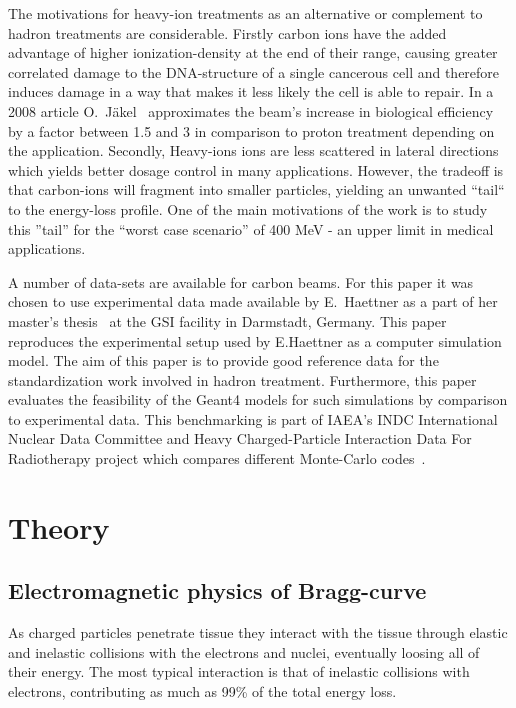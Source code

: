 The motivations for heavy-ion treatments as an alternative or complement to hadron treatments are considerable. Firstly carbon ions have the added advantage of higher ionization-density at the end of their range, causing greater correlated damage to the DNA-structure of a single cancerous cell and therefore induces damage in a way that makes it less likely the cell is able to repair. In a 2008 article O.~Jäkel~\cite{ojakel} approximates the beam's increase in biological efficiency by a factor between 1.5 and 3 in comparison to proton treatment depending on the application. Secondly, Heavy-ions ions are less scattered in lateral directions which yields better dosage control in many applications. However, the tradeoff is that carbon-ions will fragment into smaller particles, yielding an unwanted ``tail`` to the energy-loss profile. One of the main motivations of the work is to study this ''tail'' for the ``worst case scenario'' of 400 MeV - an upper limit in medical applications.

A number of data-sets are available for carbon beams. For this paper it was chosen to use experimental data made available by E.~Haettner as a part of her master's thesis~\cite{ehaettner} at the GSI facility in Darmstadt, Germany. This paper reproduces the experimental setup used by E.Haettner as a computer simulation model. The aim of this paper is to provide good reference data for the standardization work involved in hadron treatment. Furthermore, this paper evaluates the feasibility of the Geant4 models for such simulations by comparison to experimental data. This benchmarking is part of IAEA's INDC International Nuclear Data Committee and Heavy Charged-Particle Interaction Data For Radiotherapy project which compares different Monte-Carlo codes~\cite{SummaryReport}.



\clearpage
\section{Theory}

\subsection{Electromagnetic physics of Bragg-curve}
As charged particles penetrate tissue they interact with the tissue through elastic and inelastic collisions with the electrons and nuclei, eventually loosing all of their energy. The most typical interaction is that of inelastic collisions with electrons, contributing as much as 99\% of the total energy loss.

